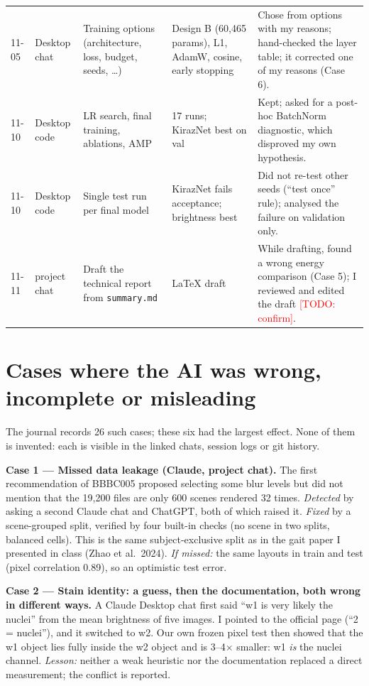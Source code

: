 \documentclass[11pt,a4paper]{article}
\newcommand{\kn}{KirazNet}
\newcommand{\todo}[1]{\textcolor{red}{[TODO: #1]}}
\begin{document}
\begin{center}
\begin{tabularx}{\linewidth}{@{}p{1.25cm}p{1.6cm}YYY@{}}
11-05 & Desktop chat & Training options (architecture, loss, budget, seeds, \ldots) & Design B (60{,}465 params),
L1, AdamW, cosine, early stopping & Chose from options with my reasons; hand-checked the layer table; it corrected
one of my reasons (Case 6).\\
11-10 & Desktop code & LR search, final training, ablations, AMP & 17 runs; \kn{} best on val & Kept; asked for a
post-hoc BatchNorm diagnostic, which disproved my own hypothesis.\\
11-10 & Desktop code & Single test run per final model & \kn{} fails acceptance; brightness best & Did not re-test
other seeds (``test once'' rule); analysed the failure on validation only.\\
11-11 & project chat & Draft the technical report from \texttt{summary.md} & LaTeX draft & While drafting, found a
wrong energy comparison (Case 5); I reviewed and edited the draft \todo{confirm}.\\
\bottomrule
\end{tabularx}
\end{center}

\section{Cases where the AI was wrong, incomplete or misleading}
The journal records 26 such cases; these six had the largest effect. None of them is invented: each is visible
in the linked chats, session logs or git history.

\textbf{Case 1 --- Missed data leakage (Claude, project chat).} The first recommendation of BBBC005 proposed
selecting some blur levels but did not mention that the 19{,}200 files are only 600 scenes rendered 32 times.
\emph{Detected} by asking a second Claude chat and ChatGPT, both of which raised it. \emph{Fixed} by a
scene-grouped split, verified by four built-in checks (no scene in two splits, balanced cells). This is the
same subject-exclusive split as in the gait paper I presented in class (Zhao et al.\ 2024). \emph{If missed:}
the same layouts in train and test (pixel correlation 0.89), so an optimistic test error.

\textbf{Case 2 --- Stain identity: a guess, then the documentation, both wrong in different ways.} A Claude
Desktop chat first said ``w1 is very likely the nuclei'' from the mean brightness of five images. I pointed to the
official page (``2 = nuclei''), and it switched to w2. Our own frozen pixel test then showed that the w1 object
lies fully inside the w2 object and is 3--4$\times$ smaller: w1 \emph{is} the nuclei channel. \emph{Lesson:}
neither a weak heuristic nor the documentation replaced a direct measurement; the conflict is reported.
\end{document}
